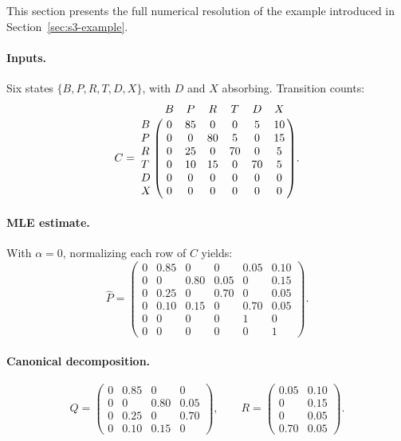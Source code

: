This section presents the full numerical resolution of the example
introduced in Section~\ref{sec:s3-example}.

\paragraph{Inputs.} Six states $\{B, P, R, T, D, X\}$, with $D$ and $X$
absorbing. Transition counts:
\begin{equation}
C = \bordermatrix{
    & B & P & R & T & D & X \cr
  B & 0 & 85 & 0 & 0 & 5 & 10 \cr
  P & 0 & 0 & 80 & 5 & 0 & 15 \cr
  R & 0 & 25 & 0 & 70 & 0 & 5 \cr
  T & 0 & 10 & 15 & 0 & 70 & 5 \cr
  D & 0 & 0 & 0 & 0 & 0 & 0 \cr
  X & 0 & 0 & 0 & 0 & 0 & 0 \cr}.
\end{equation}

\paragraph{MLE estimate.} With $\alpha = 0$, normalizing each row of $C$
yields:
\begin{equation}
\hat{P} = \begin{pmatrix}
0 & 0.85 & 0    & 0    & 0.05 & 0.10 \\
0 & 0    & 0.80 & 0.05 & 0    & 0.15 \\
0 & 0.25 & 0    & 0.70 & 0    & 0.05 \\
0 & 0.10 & 0.15 & 0    & 0.70 & 0.05 \\
0 & 0    & 0    & 0    & 1    & 0    \\
0 & 0    & 0    & 0    & 0    & 1
\end{pmatrix}.
\end{equation}

\paragraph{Canonical decomposition.}
\begin{equation}
Q = \begin{pmatrix}
0 & 0.85 & 0    & 0    \\
0 & 0    & 0.80 & 0.05 \\
0 & 0.25 & 0    & 0.70 \\
0 & 0.10 & 0.15 & 0
\end{pmatrix}, \qquad
R = \begin{pmatrix}
0.05 & 0.10 \\
0    & 0.15 \\
0    & 0.05 \\
0.70 & 0.05
\end{pmatrix}.
\end{equation}

